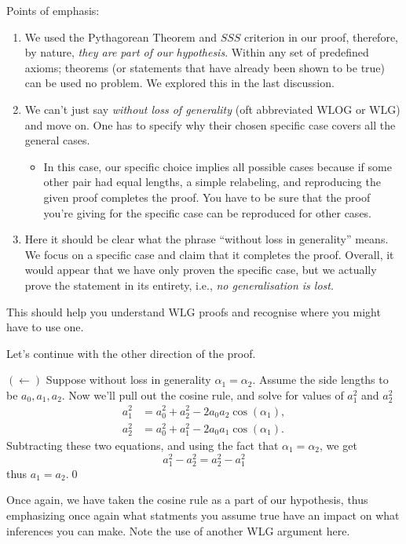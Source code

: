 Points of emphasis:
\begin{enumerate}
    \item We used the Pythagorean Theorem and $SSS$ criterion in our proof, therefore, by nature, \textit{they are part of our hypothesis}. Within any set of predefined axioms; theorems (or statements that have already been shown to be true) can be used no problem. We explored this in the last discussion.
    \item We can't just say \textit{without loss of generality} (oft abbreviated $\text{WLOG}$ or $\text{WLG}$) and move on. One has to specify why their chosen specific case covers all the general cases.
    \begin{itemize}
        \item In this case, our specific choice implies all possible cases because if some other pair had equal lengths, a simple relabeling, and reproducing the given proof completes the proof. You have to be sure that the proof you're giving for the specific case can be reproduced for other cases.
    \end{itemize}
    \item Here it should be clear what the phrase ``without loss in generality'' means. We focus on a specific case and claim that it completes the proof. Overall, it would appear that we have only proven the specific case, but we actually prove the statement in its entirety, i.e., \textit{no generalisation is lost}.
\end{enumerate}

This should help you understand $\text{WLG}$ proofs and recognise where you might have to use one.

Let's continue with the other direction of the proof.
\begin{smrg}
$(\leftarrow)$ Suppose without loss in generality $\alpha_1 = \alpha_2$. Assume the side lengths to be $a_0, a_1, a_2$. Now we'll pull out the cosine rule, and solve for values of $a_1^2$ and $a_2^2$
\begin{align*}
    a_1^2 &= a_0^2 + a_2^2 - 2a_0 a_2 \cos(\alpha_1), \\
    a_2^2 &= a_0^2 + a_1^2 - 2a_0 a_1 \cos(\alpha_1).
\end{align*}
Subtracting these two equations, and using the fact that $\alpha_1 = \alpha_2$, we get
\[
a_1^2 - a_2^2 = a_2^2 - a_1^2
\]
thus $a_1 = a_2$.\qed
\end{smrg}
Once again, we have taken the cosine rule as a part of our hypothesis, thus emphasizing once again what statments you assume true have an impact on what inferences you can make. Note the use of another WLG argument here.
